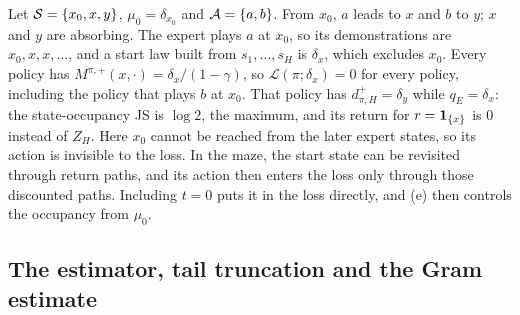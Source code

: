 \begin{example}\label{ex:fbil-blind}
Let $\mathcal{S}=\{x_0,x,y\}$, $\mu_0=\delta_{x_0}$ and $\mathcal{A}=\{a,b\}$. From $x_0$, $a$ leads to $x$ and $b$ to $y$; $x$ and $y$ are absorbing.
The expert plays $a$ at $x_0$, so its demonstrations are $x_0,x,x,\dots$, and a start law built from $s_1,\dots,s_H$ is $\delta_x$, which excludes $x_0$.
Every policy has $M^{\pi,+}(x,\cdot)=\delta_x/(1-\gamma)$, so $\mathcal L(\pi;\delta_x)=0$ for every policy, including the policy that plays $b$ at $x_0$.
That policy has $d^+_{\pi,H}=\delta_y$ while $q_E=\delta_x$: the state-occupancy JS is $\log2$, the maximum, and its return for $r=\mathbf{1}_{\{x\}}$ is $0$ instead of $Z_H$.
Here $x_0$ cannot be reached from the later expert states, so its action is invisible to the loss. In the maze, the start state can be revisited through return paths, and its action then enters the loss only through those discounted paths.
Including $t=0$ puts it in the loss directly, and (e) then controls the occupancy from $\mu_0$.
\end{example}

\subsection{The estimator, tail truncation and the Gram estimate}\label{sec:fbil-est}

